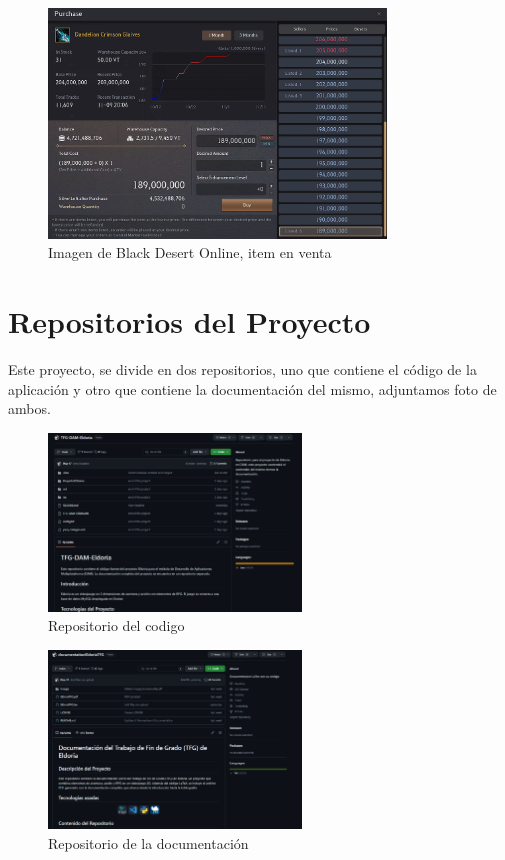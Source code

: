 \documentclass[a4paper]{article}
\begin{document}
\begin{figure}[ht]
    \centering
    \includegraphics[width=0.8\textwidth]{Images/itemblackdesert.png}
    \caption{Imagen de Black Desert Online, item en venta}
    \label{fig:blackdesertfigure}
\end{figure}
\clearpage
\section{Repositorios del Proyecto}
Este proyecto, se divide en dos repositorios, uno que contiene el código de la aplicación y otro que contiene la documentación del mismo, adjuntamos foto de ambos.
\begin{figure}[ht]
    \centering
    \includegraphics[width=0.6\textwidth]{Images/codigorepo.png}
    \caption{Repositorio del codigo}
    \label{fig:codigorepo}
\end{figure}
\begin{figure}[ht]
    \centering
    \includegraphics[width=0.6\textwidth]{Images/documentacionrepo.png}
    \caption{Repositorio de la documentación}
    \label{fig:documentacionrepo}
\end{figure}
\clearpage
\end{document}
